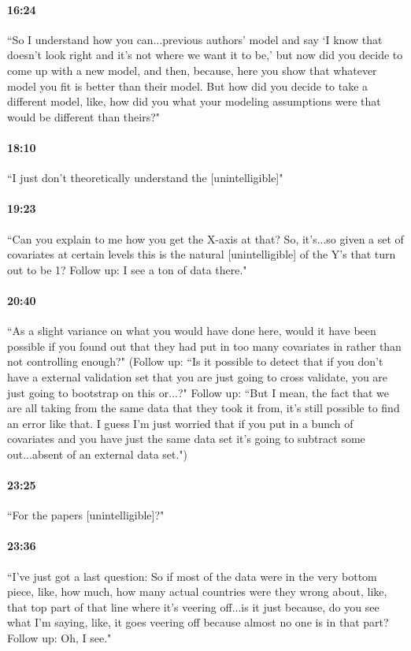 \documentclass[11pt]{article}
\begin{document}
\paragraph{16:24} ``So I understand how you can...previous authors' model and say `I know that doesn't look right and it's not where we want it to be,' but now did you decide to come up with a new model, and then, because, here you show that whatever model you fit is better than their model. But how did you decide to take a different model, like, how did you what your modeling assumptions were that would be different than theirs?"

\paragraph{18:10} ``I just don't theoretically understand the [unintelligible]"

\paragraph{19:23} ``Can you explain to me how you get the X-axis at that? So, it's...so given a set of covariates at certain levels this is the natural [unintelligible] of the Y's that turn out to be 1? Follow up: I see a ton of data there."

\paragraph{20:40} ``As a slight variance on what you would have done here, would it have been possible if you found out that they had put in too many covariates in rather than not controlling enough?" (Follow up: ``Is it possible to detect that if you don't have a external validation set that you are just going to cross validate, you are just going to bootstrap on this or...?" Follow up: ``But I mean, the fact that we are all taking from the same data that they took it from, it's still possible to find an error like that. I guess I'm just worried that if you put in a bunch of covariates and you have just the same data set it's going to subtract some out...absent of an external data set.")

\paragraph{23:25} ``For the papers [unintelligible]?"

\paragraph{23:36} ``I've just got a last question: So if most of the data were in the very bottom piece, like, how much, how many actual countries were they wrong about, like, that top part of that line where it's veering off...is it just because, do you see what I'm saying, like, it goes veering off because almost no one is in that part? Follow up: Oh, I see."
\end{document}
